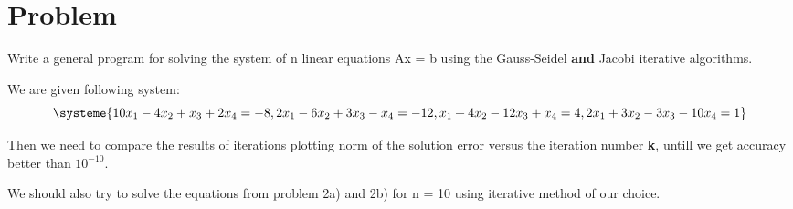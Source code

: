 \section{Problem}
Write a general program for solving the system of n linear equations Ax = b using the Gauss-Seidel \textbf{and} Jacobi iterative algorithms.

We are given following system:
\[
\systeme{10x_1-4x_2+x_3+2x_4=-8, 2x_1-6x_2+3x_3-x_4=-12, x_1+4x_2-12x_3+x_4=4, 2x_1+3x_2-3x_3-10x_4=1}
\]

Then we need to compare the results of iterations plotting norm of the solution error versus the iteration number \textbf{k}, untill we get accuracy better than $10^{-10}$.

We should also try to solve the equations from problem 2a) and 2b) for n = 10 using iterative method of our choice.


